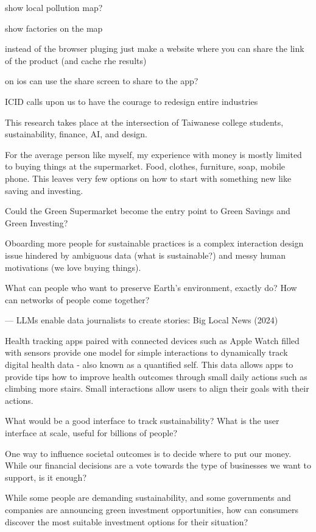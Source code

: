 \documentclass[
  letterpaper,
  DIV=11,
  numbers=noendperiod]{scrartcl}
\begin{document}
show local pollution map?

show factories on the map

instead of the browser pluging just make a website where you can share
the link of the product (and cache rhe results)

on ios can use the share screen to share to the app?

ICID calls upon us to have the courage to redesign entire industries

This research takes place at the intersection of Taiwanese college
students, sustainability, finance, AI, and design.

For the average person like myself, my experience with money is mostly
limited to buying things at the supermarket. Food, clothes, furniture,
soap, mobile phone. This leaves very few options on how to start with
something new like saving and investing.

Could the Green Supermarket become the entry point to Green Savings and
Green Investing?

Oboarding more people for sustainable practices is a complex interaction
design issue hindered by ambiguous data (what is sustainable?) and messy
human motivations (we love buying things).

What can people who want to preserve Earth's environment, exactly do?
How can networks of people come together?

--- LLMs enable data journalists to create stories: Big Local News
(2024)

Health tracking apps paired with connected devices such as Apple Watch
filled with sensors provide one model for simple interactions to
dynamically track digital health data - also known as a quantified self.
This data allows apps to provide tips how to improve health outcomes
through small daily actions such as climbing more stairs. Small
interactions allow users to align their goals with their actions.

What would be a good interface to track sustainability? What is the user
interface at scale, useful for billions of people?

One way to influence societal outcomes is to decide where to put our
money. While our financial decisions are a vote towards the type of
businesses we want to support, is it enough?

While some people are demanding sustainability, and some governments and
companies are announcing green investment opportunities, how can
consumers discover the most suitable investment options for their
situation?
\end{document}
